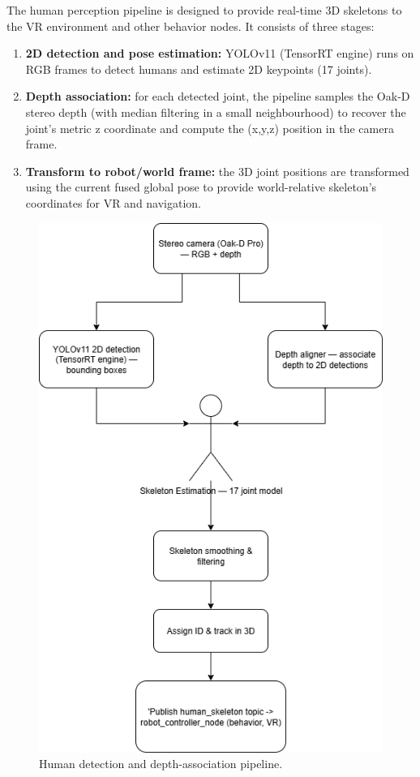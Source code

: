 The human perception pipeline is designed to provide real-time 3D skeletons to the VR environment and other behavior nodes. It consists of three stages:

\begin{enumerate}
	\item \textbf{2D detection and pose estimation:} YOLOv11 (TensorRT engine) runs on RGB frames to detect humans and estimate 2D keypoints (17 joints).
	\item \textbf{Depth association:} for each detected joint, the pipeline samples the Oak‑D stereo depth (with median filtering in a small neighbourhood) to recover the joint's metric z coordinate and compute the (x,y,z) position in the camera frame.
	\item \textbf{Transform to robot/world frame:} the 3D joint positions are transformed using the current fused global pose to provide world-relative skeleton's coordinates for VR and navigation.
\end{enumerate}

\begin{figure}[H]
	\centering
	\includegraphics[width=0.85\linewidth]{Images/human_pipeline.png}
	\caption{Human detection and depth-association pipeline.}\label{fig-human-pipeline}
\end{figure}

